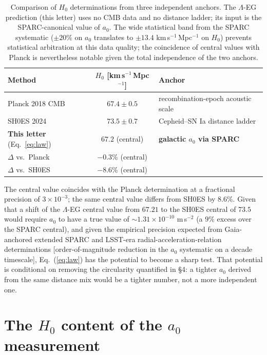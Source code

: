 \documentclass[11pt,a4paper]{article}
\begin{document}
\begin{table}[h]
\centering
\begin{tabular}{lcl}
\toprule
Method & $H_0$ [km\,s$^{-1}$\,Mpc$^{-1}$] & Anchor \\
\midrule
Planck 2018 CMB          & $67.4 \pm 0.5$   & recombination-epoch acoustic scale \\
SH0ES 2024               & $73.5 \pm 0.7$   & Cepheid--SN Ia distance ladder \\
\textbf{This letter} (Eq.~\ref{eq:law}) & $\mathbf{67.2}$ (central) & \textbf{galactic $a_0$ via SPARC} \\
\midrule
$\Delta$ vs.\ Planck  & $-0.3\%$ (central) & \\
$\Delta$ vs.\ SH0ES   & $-8.6\%$ (central) & \\
\bottomrule
\end{tabular}
\caption{Comparison of $H_0$ determinations from three independent anchors.
The $\Lambda$-EG prediction (this letter) uses no CMB data and no distance
ladder; its input is the SPARC-canonical value of $a_0$. The wide statistical
band from the SPARC systematic ($\pm 20\%$ on $a_0$ translates to $\pm 13.4$
km\,s$^{-1}$\,Mpc$^{-1}$ on $H_0$) prevents statistical arbitration at this
data quality; the coincidence of central values with Planck is nevertheless
notable given the total independence of the two anchors.}
\label{tab:H0}
\end{table}

The central value coincides with the Planck determination at a fractional
precision of $3 \times 10^{-3}$; the same central value differs from SH0ES
by $8.6\%$. Given that a shift of the $\Lambda$-EG central value from
$67.21$ to the SH0ES central of $73.5$ would require $a_0$ to have a true
value of $\sim 1.31 \times 10^{-10}$ m\,s$^{-2}$ (a $9\%$ excess over the SPARC
central), and given the empirical precision expected from Gaia-anchored
extended SPARC and LSST-era radial-acceleration-relation determinations
[order-of-magnitude reduction in the $a_0$ systematic on a decade timescale],
Eq.~(\ref{eq:law}) has the potential to become a sharp test. That potential
is conditional on removing the circularity quantified in \S4: a tighter
$a_0$ derived from the same distance mix would be a tighter number, not a
more independent one.

\section{The $H_0$ content of the $a_0$ measurement}
\label{sec:selfconsistency}
\end{document}
